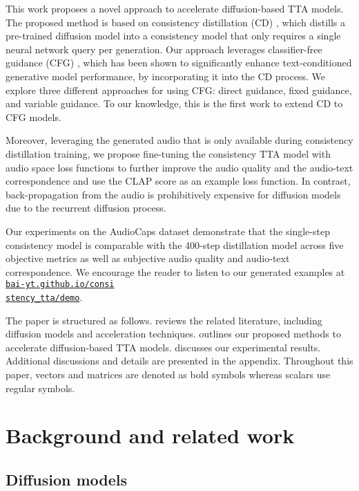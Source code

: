 \documentclass{article}
\begin{document}
This work proposes a novel approach to accelerate diffusion-based TTA models. The proposed method is based on consistency distillation (CD) \cite{cm}, which distills a pre-trained diffusion model into a consistency model that only requires a single neural network query per generation. Our approach leverages classifier-free guidance (CFG) \cite{cfg}, which has been shown to significantly enhance text-conditioned generative model performance, by incorporating it into the CD process. We explore three different approaches for using CFG: direct guidance, fixed guidance, and variable guidance. To our knowledge, this is the first work to extend CD to CFG models.

Moreover, leveraging the generated audio that is only available during consistency distillation training, we propose fine-tuning the consistency TTA model with audio space loss functions to further improve the audio quality and the audio-text correspondence and use the CLAP score as an example loss function. In contrast, back-propagation from the audio is prohibitively expensive for diffusion models due to the recurrent diffusion process.

Our experiments on the AudioCaps dataset demonstrate that the single-step consistency model is comparable with the 400-step distillation model across five objective metrics as well as subjective audio quality and audio-text correspondence. We encourage the reader to listen to our generated examples at \href{https://bai-yt.github.io/consistency_tta/demo.html}{\texttt{bai-yt.github.io/consi\\stency\_tta/demo}}.

The paper is structured as follows.  reviews the related literature, including diffusion models and acceleration techniques.  outlines our proposed methods to accelerate diffusion-based TTA models.  discusses our experimental results. Additional discussions and details are presented in the appendix. Throughout this paper, vectors and matrices are denoted as bold symbols whereas scalars use regular symbols.



\section{Background and related work} \label{sec:background}

\subsection{Diffusion models}
\end{document}
